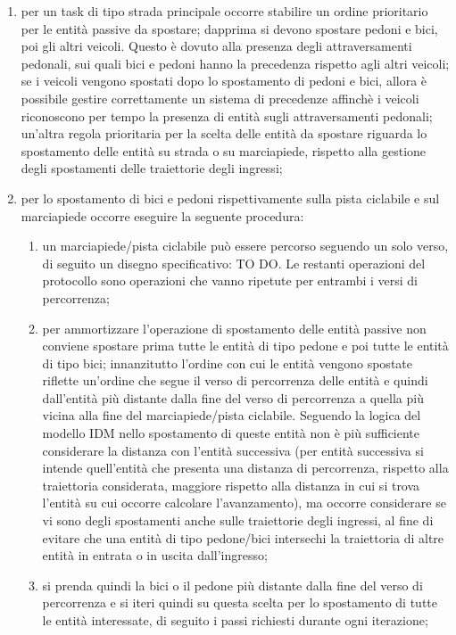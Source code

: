 \begin{enumerate}
\item per un task di tipo strada principale occorre stabilire un ordine prioritario per le entità passive da spostare; dapprima si devono spostare pedoni e bici, poi gli altri veicoli. Questo è dovuto alla presenza degli attraversamenti pedonali, sui quali bici e pedoni hanno la precedenza rispetto agli altri veicoli; se i veicoli vengono spostati dopo lo spostamento di pedoni e bici, allora è possibile gestire correttamente un sistema di precedenze affinchè i veicoli riconoscono per tempo la presenza di entità sugli attraversamenti pedonali; un'altra regola prioritaria per la scelta delle entità da spostare riguarda lo spostamento delle entità su strada o su marciapiede, rispetto alla gestione degli spostamenti delle traiettorie degli ingressi;
\item per lo spostamento di bici e pedoni rispettivamente sulla pista ciclabile e sul marciapiede occorre eseguire la seguente procedura:
\begin{enumerate}
\item un marciapiede/pista ciclabile può essere percorso seguendo un solo verso, di seguito un disegno specificativo: TO DO. Le restanti operazioni del protocollo sono operazioni che vanno ripetute per entrambi i versi di percorrenza;
\item per ammortizzare l'operazione di spostamento delle entità passive non conviene spostare prima tutte le entità di tipo pedone e poi tutte le entità di tipo bici; innanzitutto l'ordine con cui le entità vengono spostate riflette un'ordine che segue il verso di percorrenza delle entità e quindi dall'entità più distante dalla fine del verso di percorrenza a quella più vicina alla fine del marciapiede/pista ciclabile. Seguendo la logica del modello IDM nello spostamento di queste entità non è più sufficiente considerare la distanza con l'entità successiva (per entità successiva si intende quell'entità che presenta una distanza di percorrenza, rispetto alla traiettoria considerata, maggiore rispetto alla distanza in cui si trova l'entità su cui occorre calcolare l'avanzamento), ma occorre considerare se vi sono degli spostamenti anche sulle traiettorie degli ingressi, al fine di evitare che una entità di tipo pedone/bici intersechi la traiettoria di altre entità in entrata o in uscita dall'ingresso;
\item si prenda quindi la bici o il pedone più distante dalla fine del verso di percorrenza e si iteri quindi su questa scelta per lo spostamento di tutte le entità interessate, di seguito i passi richiesti durante ogni iterazione;

\end{enumerate}
\end{enumerate}
